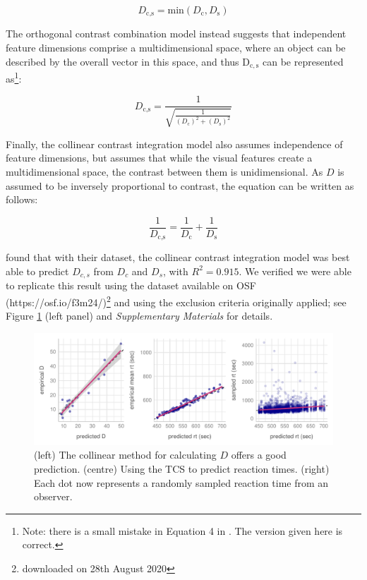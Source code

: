 \documentclass[preprint,12pt,authoryear]{elsarticle}
\begin{document}
\begin{equation}
D_\text{c,s} = \text{min}\left(D_\text{c}, D_\text{s}\right)
\label{eq:bestfeature}
\end{equation}

The orthogonal contrast combination model instead suggests that independent feature dimensions comprise a multidimensional space, where an object can be described by the overall vector in this space, and thus $\mathrm{D_{c,s}}$ can be represented as\footnote{Note: there is a small mistake in Equation 4 in \cite{buetti2019predicting}. The version given here is correct.}:

\begin{equation}
D_\text{c,s} = \frac{1}{\sqrt{\frac{1}{(D_\text{c})^2 + (D_\text{s})^2}}}
\label{eq:orthogonalcontrast}
\end{equation}

Finally, the collinear contrast integration model also assumes independence of feature dimensions, but assumes that while the visual features create a multidimensional space, the contrast between them is unidimensional. As $D$ is assumed to be inversely proportional to contrast, the equation can be written as follows:

\begin{equation}
\frac{1}{D_\text{c,s}} = \frac{1}{D_\text{c}} + \frac{1}{D_\text{s}}
\label{eq:collinearcontrast}
\end{equation}

\cite{buetti2019predicting} found that with their dataset, the collinear contrast integration model was best able to predict $D_{c,s}$ from $D_c$ and $D_s$, with $R^2 = 0.915$. We verified we were able to replicate this result using the dataset available on OSF (https://osf.io/f3m24/)\footnote{downloaded on 28th August 2020} and using the exclusion criteria originally applied; see Figure \ref{fig:comp_rep} (left panel) and \textit{Supplementary Materials} for details.

\begin{figure}
\centering
\includegraphics[width=\textwidth]{../plots/computational_replication.pdf}
\caption{(left) The collinear method for calculating $D$ offers a good prediction. (centre) Using the TCS to predict reaction times. (right) Each dot now represents a randomly sampled reaction time from an observer.}
\label{fig:comp_rep}
\end{figure}
\end{document}
